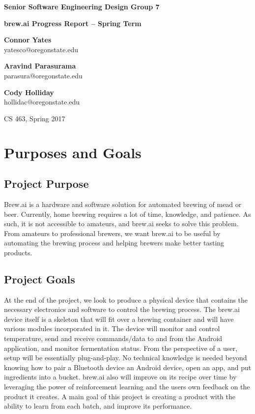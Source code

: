 \documentclass[draftclsnofoot,onecolumn,letterpaper,10pt]{IEEEtran}
\begin{document}
\begin{center}
	{\huge\textbf{Senior Software Engineering Design Group 7}}
	\vspace{1cm}

	{\Huge\textbf{brew.ai Progress Report -- Spring Term}}

	\vspace{2cm}
	\textbf{Connor Yates}\\yatesco@oregonstate.edu

	\textbf{Aravind Parasurama}\\parasura@oregonstate.edu

	\textbf{Cody Holliday}\\hollidac@oregonstate.edu

	\vspace{2cm}
	{\Large CS 463, Spring 2017}
	\vspace{1cm}
\end{center}

\begin{abstract}

\end{abstract}

\newpage
\tableofcontents
\newpage

\section{Purposes and Goals}
\subsection{Project Purpose}
Brew.ai is a hardware and software solution for automated brewing of mead or beer.
Currently, home brewing requires a lot of time, knowledge, and patience.
As such, it is not accessible to amateurs, and brew.ai seeks to solve this problem.
From amateurs to professional brewers, we want brew.ai to be useful by automating the brewing process and helping brewers make better tasting products.

\subsection{Project Goals}
At the end of the project, we look to produce a physical device that contains the necessary electronics and software to control the brewing process.
The brew.ai device itself is a skeleton that will fit over a brewing container and will have various modules incorporated in it.
The device will monitor and control temperature, send and receive commands/data to and from the Android application, and monitor fermentation status.
From the perspective of a user, setup will be essentially plug-and-play.
No technical knowledge is needed beyond knowing how to pair a Bluetooth device an Android device, open an app, and put ingredients into a bucket.
brew.ai also will improve on its recipe over time by leveraging the power of reinforcement learning and the users own feedback on the product it creates.
A main goal of this project is creating a product with the ability to learn from each batch, and improve its performance.
\end{document}
